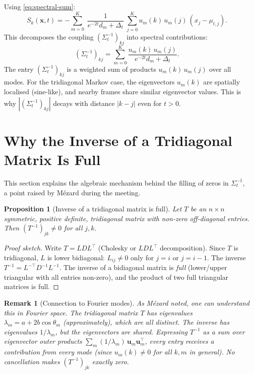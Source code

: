 \documentclass[11pt,a4paper]{article}
\newtheorem{proposition}[theorem]{Proposition}
\newtheorem{remark}[theorem]{Remark}
\newcommand{\Dt}{\Delta_t}
\begin{document}
Using \eqref{eq:spectral-sum}:
\begin{equation}\label{eq:sk-spectral}
  S_k(\mathbf{x}, t) = -\sum_{m=0}^{K}\;\frac{1}{e^{-2t}d_m + \Dt}\;\sum_{j=0}^{K} u_m(k)\,u_m(j)\,(x_j - \mu_{t,j}).
\end{equation}
This decomposes the coupling $(\Sigma_t^{-1})_{kj}$ into spectral contributions:
\begin{equation}\label{eq:precision-spectral}
  (\Sigma_t^{-1})_{kj} = \sum_{m=0}^{K} \frac{u_m(k)\,u_m(j)}{e^{-2t}d_m + \Dt}.
\end{equation}
The entry $(\Sigma_t^{-1})_{kj}$ is a weighted sum of products $u_m(k)\,u_m(j)$ over all modes.  For the tridiagonal Markov case, the eigenvectors $u_m(k)$ are spatially localised (sine-like), and nearby frames share similar eigenvector values.  This is why $|(\Sigma_t^{-1})_{kj}|$ decays with distance $|k - j|$ even for $t > 0$.


\section{Why the Inverse of a Tridiagonal Matrix Is Full}
\label{sec:tridiag-inverse}

This section explains the algebraic mechanism behind the filling of zeros in $\Sigma_t^{-1}$, a point raised by M\'ezard during the meeting.

\begin{proposition}[Inverse of a tridiagonal matrix is full]\label{prop:tridiag-full}
Let $T$ be an $n \times n$ symmetric, positive definite, tridiagonal matrix with non-zero off-diagonal entries.  Then $(T^{-1})_{jk} \neq 0$ for all $j, k$.
\end{proposition}

\begin{proof}[Proof sketch]
Write $T = LDL^\top$ (Cholesky or $LDL^\top$ decomposition).  Since $T$ is tridiagonal, $L$ is lower bidiagonal: $L_{ij} \neq 0$ only for $j = i$ or $j = i-1$.  The inverse $T^{-1} = L^{-\top}D^{-1}L^{-1}$.  The inverse of a bidiagonal matrix is \emph{full} (lower/upper triangular with all entries non-zero), and the product of two full triangular matrices is full.
\end{proof}

\begin{remark}[Connection to Fourier modes]\label{rem:fourier}
As M\'ezard noted, one can understand this in Fourier space.  The tridiagonal matrix $T$ has eigenvalues $\lambda_m = a + 2b\cos\theta_m$ (approximately), which are all distinct.  The inverse has eigenvalues $1/\lambda_m$, but the \emph{eigenvectors} are shared.  Expressing $T^{-1}$ as a sum over eigenvector outer products $\sum_m (1/\lambda_m)\,\mathbf{u}_m \mathbf{u}_m^\top$, every entry receives a contribution from every mode (since $u_m(k) \neq 0$ for all $k, m$ in general).  No cancellation makes $(T^{-1})_{jk}$ exactly zero.
\end{remark}
\end{document}
